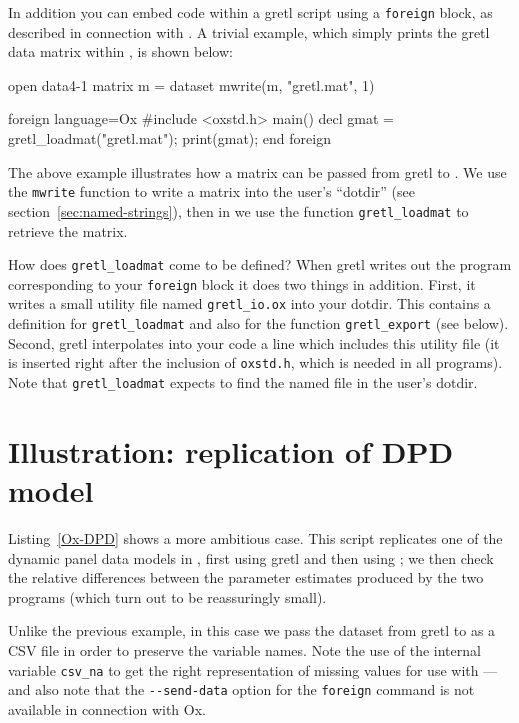 In addition you can embed  code within a gretl script
using a \texttt{foreign} block, as described in connection with
.  A trivial example, which simply prints the gretl data
matrix within , is shown below:
%
\begin{code}
open data4-1
matrix m = { dataset }
mwrite(m, "gretl.mat", 1)

foreign language=Ox 
#include <oxstd.h>
main()
{
   decl gmat = gretl_loadmat("gretl.mat");
   print(gmat);
}
end foreign
\end{code}

The above example illustrates how a matrix can be passed from
gretl to .  We use the \texttt{mwrite} function to write
a matrix into the user's ``dotdir'' (see
section~\ref{sec:named-strings}), then in  we use the function
\verb|gretl_loadmat| to retrieve the matrix.

How does \verb|gretl_loadmat| come to be defined?  When gretl
writes out the  program corresponding to your \texttt{foreign}
block it does two things in addition.  First, it writes a small
utility file named \verb|gretl_io.ox| into your dotdir.  This contains
a definition for \verb|gretl_loadmat| and also for the function
\verb|gretl_export| (see below).  Second, gretl interpolates
into your  code a line which includes this utility file (it is
inserted right after the inclusion of \texttt{oxstd.h}, which is
needed in all  programs).  Note that \verb|gretl_loadmat|
expects to find the named file in the user's dotdir.

\section{Illustration: replication of DPD model}
\label{sec:dpd-replication}

Listing~\ref{Ox-DPD} shows a more ambitious case.  This script
replicates one of the dynamic panel data models in
\cite{arellano-bond91}, first using gretl and then using ; we
then check the relative differences between the parameter estimates
produced by the two programs (which turn out to be reassuringly
small).

Unlike the previous example, in this case we pass the dataset from
gretl to  as a CSV file in order to preserve the
variable names.  Note the use of the internal variable \verb|csv_na|
to get the right representation of missing values for use with
---and also note that the \verb|--send-data| option for the
\texttt{foreign} command is not available in connection with Ox.

